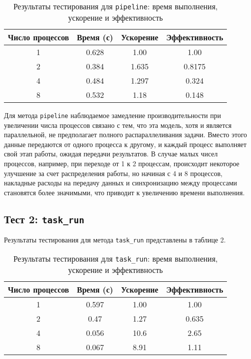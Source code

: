 \documentclass[12pt]{article}
\begin{document}
\begin{table}[H] 
\centering
\setlength{\tabcolsep}{3pt} 
\small
\begin{tabular}{|c|c|c|c|} 
\hline
\textbf{Число процессов} & \textbf{Время (с)} & \textbf{Ускорение} & \textbf{Эффективность} \\ \hline
1 & 0.628 & 1.00 & 1.00 \\ \hline
2 & 0.384 & 1.635 & 0.8175 \\ \hline
4 & 0.484 & 1.297 & 0.324 \\ \hline
8 & 0.532 & 1.18 & 0.148 \\ \hline
\end{tabular}
\caption{Результаты тестирования для \texttt{pipeline}: время выполнения, ускорение и эффективность}
\label{tab:pipeline}
\end{table}

\noindent Для метода \texttt{pipeline} наблюдаемое замедление производительности при увеличении числа процессов связано с тем, что эта модель, хотя и является параллельной, не предполагает полного распараллеливания задачи. Вместо этого данные передаются от одного процесса к другому, и каждый процесс выполняет свой этап работы, ожидая передачи результатов. В случае малых чисел процессов, например, при переходе от 1 к 2 процессам, происходит некоторое улучшение за счет распределения работы, но начиная с 4 и 8 процессов, накладные расходы на передачу данных и синхронизацию между процессами становятся более значимыми, что приводит к увеличению времени выполнения.

\subsection*{Тест 2: \texttt{task\_run}}

Результаты тестирования для метода \texttt{task\_run} представлены в таблице 2.

\begin{table}[H] 
\centering
\setlength{\tabcolsep}{3pt} 
\small
\begin{tabular}{|c|c|c|c|} 
\hline
\textbf{Число процессов} & \textbf{Время (с)} & \textbf{Ускорение} & \textbf{Эффективность} \\ \hline
1 & 0.597 & 1.00 & 1.00 \\ \hline
2 & 0.47 & 1.27 & 0.635 \\ \hline
4 & 0.056 & 10.6 & 2.65 \\ \hline
8 & 0.067 & 8.91 & 1.11 \\ \hline
\end{tabular}
\caption{Результаты тестирования для \texttt{task\_run}: время выполнения, ускорение и эффективность}
\label{tab:task_run}
\end{table}
\end{document}
